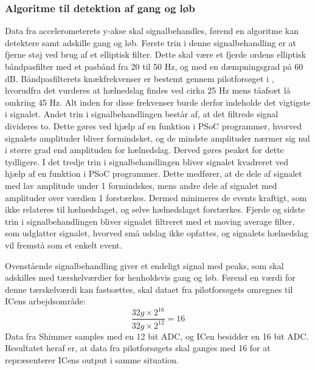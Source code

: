 \subsubsection{Algoritme til detektion af gang og løb}
Data fra accelerometerets y-akse skal signalbehandles, førend en algoritme kan detektere samt adskille gang og løb. Første trin i denne signalbehandling er at fjerne støj ved brug af et elliptisk filter. Dette skal være et fjerde ordens elliptisk båndpasfilter med et pasbånd fra 20 til 50 Hz, og med en dæmpningsgrad på 60 dB. Båndpasfilterets knækfrekvenser er bestemt gennem pilotforsøget i , hvorudfra det vurderes at hælnedslag findes ved cirka 25 Hz mens tåafsæt lå omkring 45 Hz. Alt inden for disse frekvenser burde derfor indeholde det vigtigste i signalet. %
Andet trin i signalbehandlingen består af, at det filtrede signal divideres to. Dette gøres ved hjælp af en funktion i PSoC programmer, hvorved signalets amplituder bliver formindsket, og de mindste amplituder nærmer sig nul i større grad end amplituden for hælnedslag. Derved gøres peaket for dette tydligere. I det tredje trin i signalbehandlingen bliver signalet kvadreret ved hjælp af en funktion i PSoC programmer. Dette medfører, at de dele af signalet med lav amplitude under 1 formindskes, mens andre dele af signalet med amplituder over værdien 1 forstærkes. Dermed minimeres de events kraftigt, som ikke relateres til hælnedslaget, og selve hælnedslaget forstærkes. Fjerde og sidste trin i signalbehandlingen bliver signalet filtreret med et moving average filter, som udglatter signalet, hvorved små udslag ikke opfattes, og signalets hælnedslag vil fremstå som et enkelt event.

Ovenstående signalbehandling giver et endeligt signal med peaks, som skal adskilles med tærskelværdier for henholdsvis gang og løb. Førend en værdi for denne tærskelværdi kan fastsættes, skal dataet fra pilotforsøgets omregnes til ICens arbejdsområde: 
\begin{equation}
\frac{32 g \times 2^{16}}{32 g \times 2^{12}} = 16
\label{eq:bitsammenhaeng}
\end{equation}
Data fra Shimmer samples med en 12 bit ADC, og ICen besidder en 16 bit ADC. Resultatet heraf er, at data fra pilotforsøgets skal ganges med 16 for at repræsenterer ICens output i samme situation.

